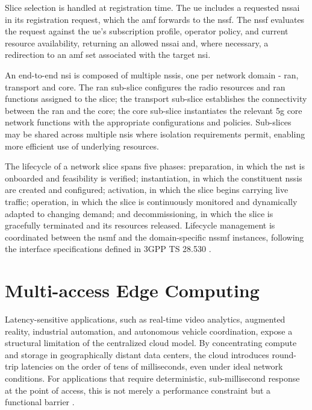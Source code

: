 Slice selection is handled at registration time. The \ac{ue} includes a requested \ac{nssai} in its registration request, which the \ac{amf} forwards to the \ac{nssf}. The \ac{nssf} evaluates the request against the \ac{ue}'s subscription profile, operator policy, and current resource availability, returning an allowed \ac{nssai} and, where necessary, a redirection to an \ac{amf} set associated with the target \ac{nsi}.

An end-to-end \ac{nsi} is composed of multiple \acp{nssi}, one per network domain - \ac{ran}, transport and core. The \ac{ran} sub-slice configures the radio resources and \ac{ran} functions assigned to the slice; the transport sub-slice establishes the connectivity between the \ac{ran} and the core; the core sub-slice instantiates the relevant \ac{5g} core network functions with the appropriate configurations and policies. Sub-slices may be shared across multiple \acp{nsi} where isolation requirements permit, enabling more efficient use of underlying resources.

The lifecycle of a network slice spans five phases: preparation, in which the \ac{nst} is onboarded and feasibility is verified; instantiation, in which the constituent \acp{nssi} are created and configured; activation, in which the slice begins carrying live traffic; operation, in which the slice is continuously monitored and dynamically adapted to changing demand; and decommissioning, in which the slice is gracefully terminated and its resources released. Lifecycle management is coordinated between the \ac{nsmf} and the domain-specific \ac{nssmf} instances, following the interface specifications defined in 3GPP TS 28.530 \cite{3GPP5GManagementorchestrationConceptsuse2026}.


\section{Multi-access Edge Computing}

Latency-sensitive applications, such as real-time video analytics, augmented reality, industrial automation, and autonomous vehicle coordination, expose a structural limitation of the centralized cloud model. By concentrating compute and storage in geographically distant data centers, the cloud introduces round-trip latencies on the order of tens of milliseconds, even under ideal network conditions. For applications that require deterministic, sub-millisecond response at the point of access, this is not merely a performance constraint but a functional barrier \cite{SatyanarayananEmergenceEdgeComputing2017}.

